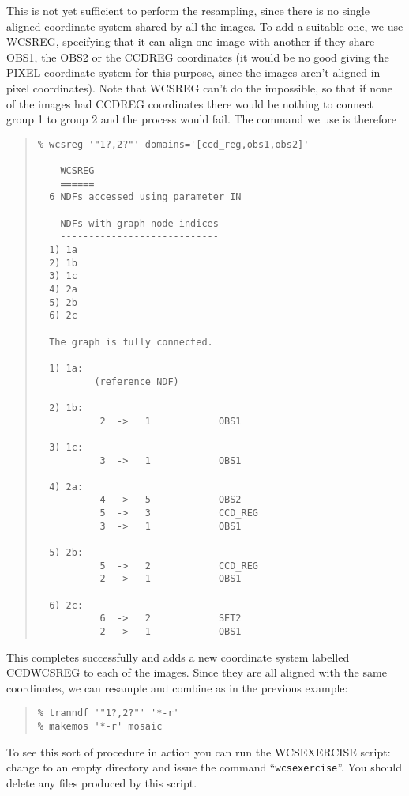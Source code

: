 \documentclass[twoside,11pt]{article}
\newcommand{\htmlref}[2]{#1}
\renewcommand{\_}{\texttt{\symbol{95}}}
\newenvironment{myquote}{\begin{quote}\begin{small}}{\end{small}\end{quote}}
\newcommand{\text}[1]{{\small \tt #1}}
\newcommand{\routine}[1]{{\sc #1}}
\newcommand{\xroutine}[1]{\htmlref{{\sc #1}}{#1}}
\begin{document}
This is not yet sufficient to perform the resampling,
since there is no single aligned coordinate system shared by all the images.
To add a suitable one, we use \xroutine{WCSREG},
specifying that it can align one image with another if they share
OBS1, the OBS2 or the CCD\_REG coordinates (it would be no good
giving the PIXEL coordinate system for this purpose, since the images aren't
aligned in pixel coordinates).
Note that \routine{WCSREG} can't do the impossible, so that if
none of the images had CCD\_REG coordinates there would be nothing
to connect group 1 to group 2 and the process would fail.
The command we use is therefore
\begin{myquote}
\begin{verbatim}
% wcsreg '"1?,2?"' domains='[ccd_reg,obs1,obs2]'

    WCSREG
    ======
  6 NDFs accessed using parameter IN

    NDFs with graph node indices
    ----------------------------
  1) 1a
  2) 1b
  3) 1c
  4) 2a
  5) 2b
  6) 2c

  The graph is fully connected.

  1) 1a:
          (reference NDF)

  2) 1b:
           2  ->   1            OBS1

  3) 1c:
           3  ->   1            OBS1

  4) 2a:
           4  ->   5            OBS2
           5  ->   3            CCD_REG
           3  ->   1            OBS1

  5) 2b:
           5  ->   2            CCD_REG
           2  ->   1            OBS1

  6) 2c:
           6  ->   2            SET2
           2  ->   1            OBS1
\end{verbatim}
\end{myquote}
This completes successfully and adds a new coordinate system
labelled CCD\_WCSREG to each of the images.
Since they are all aligned with the same coordinates, we can
resample and combine as in the previous example:
\begin{myquote}
\begin{verbatim}
% tranndf '"1?,2?"' '*-r'
% makemos '*-r' mosaic
\end{verbatim}
\end{myquote}

To see this sort of procedure in action you can run the WCSEXERCISE
script:
change to an empty directory and issue the command ``\text{wcsexercise}''.
You should delete any files produced by this script.
\end{document}
